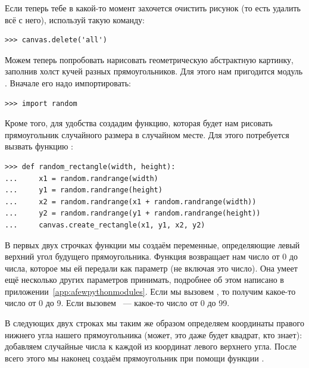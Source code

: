 Если теперь тебе в какой-то момент захочется очистить рисунок (то есть удалить всё с него), используй такую команду:
\begin{listing}
\begin{verbatim}
>>> canvas.delete('all')
\end{verbatim}
\end{listing}

Можем теперь попробовать нарисовать геометрическую абстрактную картинку, заполнив холст кучей разных прямоугольников. Для этого нам пригодится модуль . Вначале его надо импортировать:

\begin{listing}
\begin{verbatim}
>>> import random
\end{verbatim}
\end{listing}

Кроме того, для удобства создадим функцию, которая будет нам рисовать прямоугольник случайного размера в случайном месте. Для этого потребуется вызвать функцию :

\begin{listing}
\begin{verbatim}
>>> def random_rectangle(width, height):
...     x1 = random.randrange(width)
...     y1 = random.randrange(height)
...     x2 = random.randrange(x1 + random.randrange(width))
...     y2 = random.randrange(y1 + random.randrange(height))
...     canvas.create_rectangle(x1, y1, x2, y2)
\end{verbatim}
\end{listing}

В первых двух строчках функции мы создаём переменные, определяющие левый верхний угол будущего прямоугольника. Функция  возвращает нам число от 0 до числа, которое мы ей передали как параметр (не включая это число). Она умеет ещё несколько других параметров принимать, подробнее об этом написано в приложении \ref{app:afewpythonmodules}. Если мы вызовем , то получим какое-то число от 0 до 9. Если вызовем  — какое-то число от 0 до 99.

В следующих двух строках мы таким же образом определяем координаты правого нижнего угла нашего прямоугольника (может, это даже будет квадрат, кто знает): добавляем случайные числа к каждой из координат левого верхнего угла. После всего этого мы наконец создаём прямоугольник при помощи функции .

